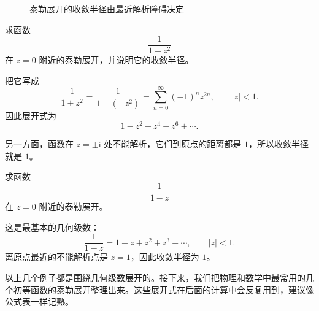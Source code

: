 \begin{figure}[htbp]
\centering
{}
\caption{泰勒展开的收敛半径由最近解析障碍决定}
\label{fig:taylor-radius}
\end{figure}

\begin{lizi}{}{}
求函数
\[
    \frac{1}{1+z^2}
\]
在 $z=0$ 附近的泰勒展开，并说明它的收敛半径。

\begin{jie}
把它写成
\[
    \frac{1}{1+z^2} = \frac{1}{1-(-z^2)}
    = \sum_{n=0}^{\infty} (-1)^n z^{2n},
\qquad |z|<1.
\]
因此展开式为
\[
    1-z^2+z^4-z^6+\cdots.
\]

另一方面，函数在 $z=\pm \mathrm{i}$ 处不能解析，它们到原点的距离都是 $1$，所以收敛半径就是 $1$。
\end{jie}
\end{lizi}

\begin{lizi}{}{}
求函数
\[
    \frac{1}{1-z}
\]
在 $z=0$ 附近的泰勒展开。

\begin{jie}
这是最基本的几何级数：
\[
    \frac{1}{1-z}=1+z+z^2+z^3+\cdots,\qquad |z|<1.
\]
离原点最近的不能解析点是 $z=1$，因此收敛半径为 $1$。
\end{jie}
\end{lizi}

以上几个例子都是围绕几何级数展开的。接下来，我们把物理和数学中最常用的几个初等函数的泰勒展开整理出来。这些展开式在后面的计算中会反复用到，建议像公式表一样记熟。

